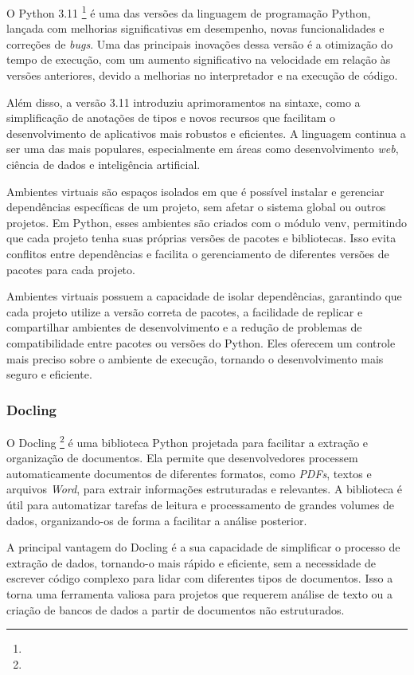 \documentclass[a4paper, 12pt]{article}
\begin{document}
    O Python 3.11 \footnote{} é uma das versões da linguagem de programação Python, lançada com melhorias significativas em desempenho, novas funcionalidades e correções de \textit{bugs}. Uma das principais inovações dessa versão é a otimização do tempo de execução, com um aumento significativo na velocidade em relação às versões anteriores, devido a melhorias no interpretador e na execução de código. 
    
    Além disso, a versão 3.11 introduziu aprimoramentos na sintaxe, como a simplificação de anotações de tipos e novos recursos que facilitam o desenvolvimento de aplicativos mais robustos e eficientes. A linguagem continua a ser uma das mais populares, especialmente em áreas como desenvolvimento \textit{web}, ciência de dados e inteligência artificial.
    
    Ambientes virtuais são espaços isolados em que é possível instalar e gerenciar dependências específicas de um projeto, sem afetar o sistema global ou outros projetos. Em Python, esses ambientes são criados com o módulo venv, permitindo que cada projeto tenha suas próprias versões de pacotes e bibliotecas. Isso evita conflitos entre dependências e facilita o gerenciamento de diferentes versões de pacotes para cada projeto.

    Ambientes virtuais possuem a capacidade de isolar dependências, garantindo que cada projeto utilize a versão correta de pacotes, a facilidade de replicar e compartilhar ambientes de desenvolvimento e a redução de problemas de compatibilidade entre pacotes ou versões do Python. Eles oferecem um controle mais preciso sobre o ambiente de execução, tornando o desenvolvimento mais seguro e eficiente.

    \subsubsection{Docling} \label{sec:docling}

    O Docling \footnote{} é uma biblioteca Python projetada para facilitar a extração e organização de documentos. Ela permite que desenvolvedores processem automaticamente documentos de diferentes formatos, como \textit{PDFs}, textos e arquivos \textit{Word}, para extrair informações estruturadas e relevantes. A biblioteca é útil para automatizar tarefas de leitura e processamento de grandes volumes de dados, organizando-os de forma a facilitar a análise posterior.

    A principal vantagem do Docling é a sua capacidade de simplificar o processo de extração de dados, tornando-o mais rápido e eficiente, sem a necessidade de escrever código complexo para lidar com diferentes tipos de documentos. Isso a torna uma ferramenta valiosa para projetos que requerem análise de texto ou a criação de bancos de dados a partir de documentos não estruturados.
\end{document}
